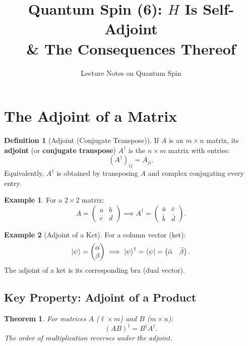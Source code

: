 \documentclass[11pt,a4paper]{article}
\title{\textbf{Quantum Spin (6): $H$ Is Self-Adjoint \\ \& The Consequences Thereof}}
\author{Lecture Notes on Quantum Spin}
\date{}
\theoremstyle{definition}
\newtheorem{definition}{Definition}[section]
\newtheorem{example}{Example}[section]
\theoremstyle{plain}
\newtheorem{theorem}{Theorem}[section]
\theoremstyle{remark}
\begin{document}
\maketitle
\tableofcontents
\newpage

\section{The Adjoint of a Matrix}

\begin{definition}[Adjoint (Conjugate Transpose)]
    If $A$ is an $m \times n$ matrix, its \textbf{adjoint} (or \textbf{conjugate transpose}) $A^\dagger$ is the $n \times m$ matrix with entries:
    \[
        (A^\dagger)_{ij} = \overline{A_{ji}}.
    \]
    Equivalently, $A^\dagger$ is obtained by transposing $A$ and complex conjugating every entry.
\end{definition}

\begin{example}
    For a $2\times 2$ matrix:
    \[
        A = \begin{pmatrix}a & b \\ c & d\end{pmatrix} \implies A^\dagger = \begin{pmatrix}\bar{a} & \bar{c} \\ \bar{b} & \bar{d}\end{pmatrix}.
    \]
\end{example}

\begin{example}[Adjoint of a Ket]
    For a column vector (ket):
    \[
        \ket{\psi} = \begin{pmatrix}\alpha\\\beta\end{pmatrix} \implies \ket{\psi}^\dagger = \bra{\psi} = \begin{pmatrix}\bar{\alpha} & \bar{\beta}\end{pmatrix}.
    \]
    The adjoint of a ket is its corresponding bra (dual vector).
\end{example}

\subsection{Key Property: Adjoint of a Product}

\begin{theorem}
    For matrices $A$ ($\ell \times m$) and $B$ ($m \times n$):
    \[
        (AB)^\dagger = B^\dagger A^\dagger.
    \]
    The order of multiplication reverses under the adjoint.
\end{theorem}
\end{document}
